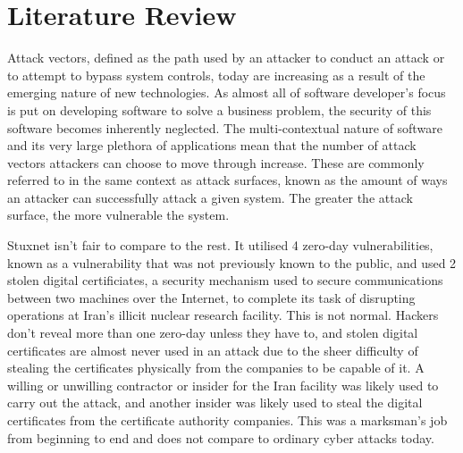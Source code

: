 \documentclass[a4paper, 11pt]{article}
\begin{document}
\section{Literature Review}
Attack vectors, defined as the path used by an attacker to conduct an attack or to attempt to bypass system controls, \cite{ref:biometricattackvectors} today are increasing as a result of the emerging nature of new technologies. \cite{ref:jang2014survey} As almost all of software developer's focus is put on developing software to solve a business problem, the security of this software becomes inherently neglected. The multi-contextual nature of software and its very large plethora of applications mean that the number of attack vectors attackers can choose to move through increase. These are commonly referred to in the same context as attack surfaces, known as the amount of ways an attacker can successfully attack a given system.  The greater the attack surface, the more vulnerable the system.

Stuxnet isn't fair to compare to the rest. It utilised 4 zero-day vulnerabilities, known as a vulnerability that was not previously known to the public, and used 2 stolen digital certificiates, a security mechanism used to secure communications between two machines over the Internet, \cite{ref:stuxnet2011report} to complete its task of disrupting operations at Iran's illicit nuclear research facility. \cite{ref:singer2014cybersecurity} This is not normal. Hackers don't reveal more than one zero-day unless they have to, and stolen digital certificates are almost never used in an attack due to the sheer difficulty of stealing the certificates physically from the companies to be capable of it. \cite{ref:singer2014cybersecurity} A willing or unwilling contractor or insider for the Iran facility was likely used to carry out the attack, and another insider was likely used to steal the digital certificates from the certificate authority companies. \cite{ref:stuxnet2011report} This was a marksman's job from beginning to end and does not compare to ordinary cyber 
attacks today. \cite{ref:stuxnet2011report}
\end{document}
